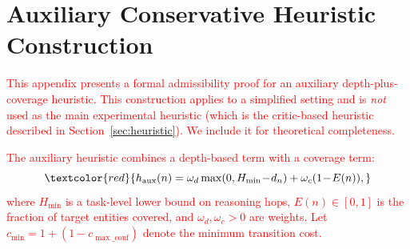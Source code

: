 \documentclass[11pt]{article}
\begin{document}




\appendix

\section{Auxiliary Conservative Heuristic Construction}
\label{app:auxiliary_heuristic}

\textcolor{red}{This appendix presents a formal admissibility proof for an auxiliary depth-plus-coverage heuristic. This construction applies to a simplified setting and is \emph{not} used as the main experimental heuristic (which is the critic-based heuristic described in Section~\ref{sec:heuristic}). We include it for theoretical completeness.}

\textcolor{red}{The auxiliary heuristic combines a depth-based term with a coverage term:}
\begin{equation}
\textcolor{red}{h_{\text{aux}}(n) = \omega_d \max(0, H_{\min}\!-\!d_n) + \omega_c (1\!-\!E(n)),}
\end{equation}
\textcolor{red}{where $H_{\min}$ is a task-level lower bound on reasoning hops, $E(n) \in [0,1]$ is the fraction of target entities covered, and $\omega_d, \omega_c > 0$ are weights. Let $c_{\min} = 1 + (1 - c_{\max\_\text{conf}})$ denote the minimum transition cost.}
\end{document}
